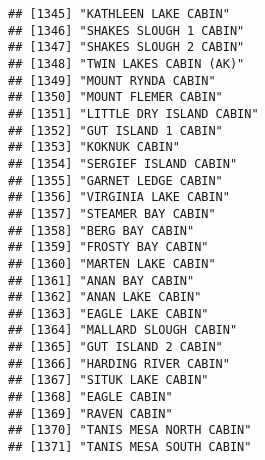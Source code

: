 \documentclass[
]{article}
\begin{document}
\begin{verbatim}
## [1345] "KATHLEEN LAKE CABIN"                                                                 
## [1346] "SHAKES SLOUGH 1 CABIN"                                                               
## [1347] "SHAKES SLOUGH 2 CABIN"                                                               
## [1348] "TWIN LAKES CABIN (AK)"                                                               
## [1349] "MOUNT RYNDA CABIN"                                                                   
## [1350] "MOUNT FLEMER CABIN"                                                                  
## [1351] "LITTLE DRY ISLAND CABIN"                                                             
## [1352] "GUT ISLAND 1 CABIN"                                                                  
## [1353] "KOKNUK CABIN"                                                                        
## [1354] "SERGIEF ISLAND CABIN"                                                                
## [1355] "GARNET LEDGE CABIN"                                                                  
## [1356] "VIRGINIA LAKE CABIN"                                                                 
## [1357] "STEAMER BAY CABIN"                                                                   
## [1358] "BERG BAY CABIN"                                                                      
## [1359] "FROSTY BAY CABIN"                                                                    
## [1360] "MARTEN LAKE CABIN"                                                                   
## [1361] "ANAN BAY CABIN"                                                                      
## [1362] "ANAN LAKE CABIN"                                                                     
## [1363] "EAGLE LAKE CABIN"                                                                    
## [1364] "MALLARD SLOUGH CABIN"                                                                
## [1365] "GUT ISLAND 2 CABIN"                                                                  
## [1366] "HARDING RIVER CABIN"                                                                 
## [1367] "SITUK LAKE CABIN"                                                                    
## [1368] "EAGLE CABIN"                                                                         
## [1369] "RAVEN CABIN"                                                                         
## [1370] "TANIS MESA NORTH CABIN"                                                              
## [1371] "TANIS MESA SOUTH CABIN"                                                              

\end{verbatim}
\end{document}
